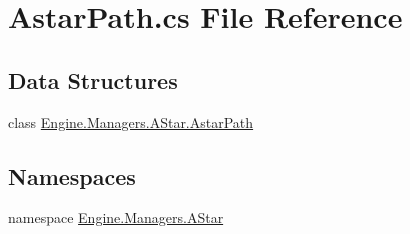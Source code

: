 \hypertarget{a00014}{}\section{Astar\+Path.\+cs File Reference}
\label{a00014}
\subsection*{Data Structures}
\begin{DoxyCompactItemize}
\item 
class \hyperlink{a00310}{Engine.\+Managers.\+A\+Star.\+Astar\+Path}
\end{DoxyCompactItemize}
\subsection*{Namespaces}
\begin{DoxyCompactItemize}
\item 
namespace \hyperlink{a00241}{Engine.\+Managers.\+A\+Star}
\end{DoxyCompactItemize}
